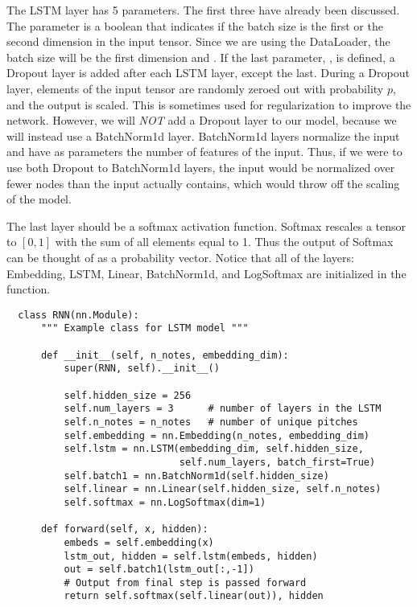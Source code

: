The LSTM layer has 5 parameters.
The first three have already been discussed.
The parameter  is a boolean that indicates if the batch size is the first or the second dimension in the input tensor.
Since we are using the DataLoader, the batch size will be the first dimension and .
If the last parameter, , is defined, a Dropout layer is added after each LSTM layer, except the last.
During a Dropout layer, elements of the input tensor are randomly zeroed out with probability $p$, and the output is scaled.
This is sometimes used for regularization to improve the network. 
However, we will \emph{NOT} add a Dropout layer to our model, because we will instead use a BatchNorm1d layer.
BatchNorm1d layers normalize the input and have as parameters the number of features of the input.
Thus, if we were to use both Dropout to BatchNorm1d layers, the input would be normalized over fewer nodes than the input actually contains, which would throw off the scaling of the model.

The last layer should be a softmax activation function.
Softmax rescales a tensor to $[0,1]$ with the sum of all elements equal to 1.
Thus the output of Softmax can be thought of as a probability vector.
Notice that all of the layers: Embedding, LSTM, Linear, BatchNorm1d, and LogSoftmax are initialized in the  function. 

\begin{lstlisting}
  class RNN(nn.Module):
      """ Example class for LSTM model """

      def __init__(self, n_notes, embedding_dim):
          super(RNN, self).__init__()
    
          self.hidden_size = 256
          self.num_layers = 3      # number of layers in the LSTM
          self.n_notes = n_notes   # number of unique pitches
          self.embedding = nn.Embedding(n_notes, embedding_dim)		
          self.lstm = nn.LSTM(embedding_dim, self.hidden_size, 
                              self.num_layers, batch_first=True)
          self.batch1 = nn.BatchNorm1d(self.hidden_size)
          self.linear = nn.Linear(self.hidden_size, self.n_notes)
          self.softmax = nn.LogSoftmax(dim=1)
    
      def forward(self, x, hidden):
          embeds = self.embedding(x)  
          lstm_out, hidden = self.lstm(embeds, hidden) 
          out = self.batch1(lstm_out[:,-1])
          # Output from final step is passed forward
          return self.softmax(self.linear(out)), hidden
      
  \end{lstlisting}

